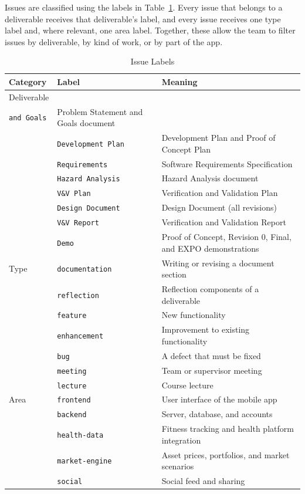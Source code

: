 \documentclass{article}
\begin{document}
Issues are classified using the labels in Table~\ref{TblLabels}. Every issue that belongs to a deliverable receives that deliverable's label, and every issue receives one type label and, where relevant, one area label. 
Together, these allow the team to filter issues by deliverable, by kind of work, or by part of the app.

\begin{table}[H]
  \caption{Issue Labels} \label{TblLabels}
  \begin{tabularx}{\textwidth}{llX}
    \toprule
    \textbf{Category} & \textbf{Label} & \textbf{Meaning}\\
    \midrule
      Deliverable & \begin{tabular}[t]{@{}l@{}}\texttt{Problem Statement}\\\texttt{and Goals}\end{tabular} & Problem Statement and Goals document\\
      & \texttt{Development Plan} & Development Plan and Proof of Concept Plan\\
      & \texttt{Requirements} & Software Requirements Specification\\
      & \texttt{Hazard Analysis} & Hazard Analysis document\\
      & \texttt{V\&V Plan} & Verification and Validation Plan\\
      & \texttt{Design Document} & Design Document (all revisions)\\
      & \texttt{V\&V Report} & Verification and Validation Report\\
      & \texttt{Demo} & Proof of Concept, Revision 0, Final, and EXPO demonstrations\\
      \midrule
      Type & \texttt{documentation} & Writing or revising a document section\\
      & \texttt{reflection} & Reflection components of a deliverable\\
      & \texttt{feature} & New functionality\\
      & \texttt{enhancement} & Improvement to existing functionality\\
      & \texttt{bug} & A defect that must be fixed\\
      & \texttt{meeting} & Team or supervisor meeting\\
      & \texttt{lecture} & Course lecture\\
      \midrule
      Area & \texttt{frontend} & User interface of the mobile app\\
      & \texttt{backend} & Server, database, and accounts\\
      & \texttt{health-data} & Fitness tracking and health platform integration\\
      & \texttt{market-engine} & Asset prices, portfolios, and market scenarios\\
      & \texttt{social} & Social feed and sharing\\
    \bottomrule
  \end{tabularx}
\end{table}
\end{document}
